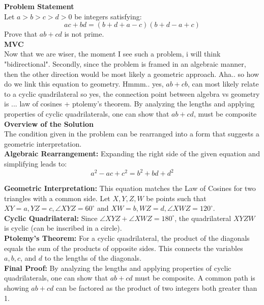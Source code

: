 \documentclass{article}
\begin{document}
\noindent \textbf{Problem Statement} \\
Let $a > b > c > d > 0$ be integers satisfying:
\begin{equation*}
    ac + bd = (b + d + a - c)(b + d - a + c)
\end{equation*}
Prove that $ab + cd$ is not prime. \\

\noindent \textbf{MVC} \\
Now that we are wiser, the moment I see such a problem, i will think "bidirectional". Secondly, since the problem is framed in an algebraic manner, then the other direction would be most likely a geometric approach. Aha.. so how do we link this equation to geometry. Hmmm.. yes, $ab + cb$, can most likely relate to a cyclic quadrilateral so yes, the connection point between algebra vs geometry is ... law of cosines + ptolemy's theorem. 
By analyzing the lengths and applying properties of cyclic quadrilaterals, one can show that $ab + cd$, must be composite \\

\noindent \textbf{Overview of the Solution} \\
The condition given in the problem can be rearranged into a form that suggests a geometric interpretation. \\

\noindent \textbf{Algebraic Rearrangement:} Expanding the right side of the given equation and simplifying leads to:
\begin{equation*}
    a^2 - ac + c^2 = b^2 + bd + d^2
\end{equation*}

\noindent \textbf{Geometric Interpretation:} This equation matches the Law of Cosines for two triangles with a common side. Let $X, Y, Z, W$ be points such that $XY = a, YZ = c, \angle XYZ = 60^\circ$ and $XW = b, WZ = d, \angle XWZ = 120^\circ$. \\

\noindent \textbf{Cyclic Quadrilateral:} Since $\angle XYZ + \angle XWZ = 180^\circ$, the quadrilateral $XYZW$ is cyclic (can be inscribed in a circle). \\

\noindent \textbf{Ptolemy's Theorem:} For a cyclic quadrilateral, the product of the diagonals equals the sum of the products of opposite sides. This connects the variables $a, b, c$, and $d$ to the lengths of the diagonals. \\

\noindent \textbf{Final Proof:} By analyzing the lengths and applying properties of cyclic quadrilaterals, one can show that $ab + cd$ must be composite. A common path is showing $ab + cd$ can be factored as the product of two integers both greater than 1. \\
\end{document}
